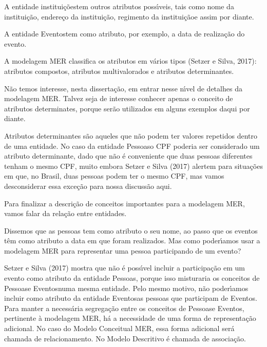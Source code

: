 \documentclass[
12pt,		%
openright,	%
twoside,  %
a4paper,			%
chapter=TITLE,		%
english,			%
french,				%
spanish,			%
brazil				%
]{USPSC-classe/USPSC}
\begin{document}
A entidade \textquotedbl institui\c{c}\~oes\textquotedbl  tem outros atributos poss\'{\i}veis, tais como \textquotedbl nome da institui\c{c}\~ao\textquotedbl , \textquotedbl endere\c{c}o da institui\c{c}\~ao\textquotedbl , \textquotedbl regimento da institui\c{c}\~ao\textquotedbl  e assim por diante.


A entidade \textquotedbl Eventos\textquotedbl  tem como atributo, por exemplo, a data de realiza\c{c}\~ao do evento.


A modelagem MER classifica os atributos em v\'arios tipos (Setzer e Silva, 2017): atributos compostos, atributos multivalorados e atributos determinantes.


N\~ao temos interesse, nesta disserta\c{c}\~ao, em entrar nesse n\'{\i}vel de detalhes da modelagem MER. Talvez seja de interesse conhecer apenas o conceito de \textquotedbl atributos determinates\textquotedbl , porque ser\~ao utilizados em alguns exemplos daqui por diante.


Atributos determinantes s\~ao aqueles que n\~ao podem ter valores repetidos dentro de uma entidade. No caso da entidade \textquotedbl Pessoas\textquotedbl  o CPF poderia ser considerado um atributo determinante, dado que n\~ao \'e conveniente que duas pessoas diferentes tenham o mesmo CPF, muito embora  Setzer e Silva (2017) alertem para situa\c{c}\~oes em que, no Brasil, duas pessoas podem ter o mesmo CPF, mas vamos desconsiderar essa exce\c{c}\~ao para nossa discuss\~ao aqui.


Para finalizar a descri\c{c}\~ao de conceitos importantes para a modelagem MER, vamos falar da rela\c{c}\~ao entre entidades.


Dissemos que as pessoas tem como atributo o seu nome, ao passo que os eventos t\^em como atributo a data em que foram realizados. Mas como poder\'{\i}amos usar a modelagem MER para representar uma pessoa participando de um evento?


Setzer e Silva (2017) mostra que n\~ao \'e poss\'{\i}vel incluir a participa\c{c}\~ao em um evento como atributo da entidade \textquotedbl Pessoas\textquotedbl , porque isso misturaria os conceitos de \textquotedbl Pessoas\textquotedbl  e \textquotedbl Eventos\textquotedbl  numa mesma entidade. Pelo mesmo motivo, n\~ao poder\'{\i}amos incluir como atributo da entidade \textquotedbl Eventos\textquotedbl  as  pessoas que participam de \textquotedbl Eventos\textquotedbl . Para manter a necess\'aria segrega\c{c}\~ao entre os conceitos de \textquotedbl Pessoas\textquotedbl  e \textquotedbl Eventos\textquotedbl , pertinente \`a modelagem MER, h\'a a necessidade de uma forma de representa\c{c}\~ao adicional. No caso do Modelo Conceitual MER, essa forma adicional ser\'a chamada de \textquotedbl relacionamento\textquotedbl . No Modelo Descritivo \'e chamada de \textquotedbl associa\c{c}\~ao\textquotedbl .
\end{document}
